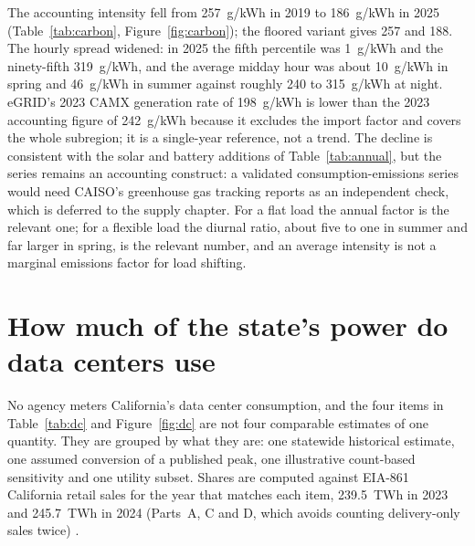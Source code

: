 \begin{table}[H]
\centering\footnotesize
\caption{CAISO battery fleet energy and peak power from the five-minute fuel mix.}
\label{tab:battery}

\end{table}

The accounting intensity fell from 257~g/kWh in 2019 to 186~g/kWh in 2025 (Table~\ref{tab:carbon}, Figure~\ref{fig:carbon}); the floored variant gives 257 and 188. The hourly spread widened: in 2025 the fifth percentile was 1~g/kWh and the ninety-fifth 319~g/kWh, and the average midday hour was about 10~g/kWh in spring and 46~g/kWh in summer against roughly 240 to 315~g/kWh at night. eGRID's 2023 CAMX generation rate of 198~g/kWh is lower than the 2023 accounting figure of 242~g/kWh because it excludes the import factor and covers the whole subregion; it is a single-year reference, not a trend. The decline is consistent with the solar and battery additions of Table~\ref{tab:annual}, but the series remains an accounting construct: a validated consumption-emissions series would need CAISO's greenhouse gas tracking reports as an independent check, which is deferred to the supply chapter. For a flat load the annual factor is the relevant one; for a flexible load the diurnal ratio, about five to one in summer and far larger in spring, is the relevant number, and an average intensity is not a marginal emissions factor for load shifting.

\section{How much of the state's power do data centers use}
\label{sec:dcload}

No agency meters California's data center consumption, and the four items in Table~\ref{tab:dc} and Figure~\ref{fig:dc} are not four comparable estimates of one quantity. They are grouped by what they are: one statewide historical estimate, one assumed conversion of a published peak, one illustrative count-based sensitivity and one utility subset. Shares are computed against EIA-861 California retail sales for the year that matches each item, 239.5~TWh in 2023 and 245.7~TWh in 2024 (Parts~A, C and D, which avoids counting delivery-only sales twice) \citep{eia861}.

\begin{table}[H]
\centering\footnotesize
\caption{Silicon Valley Power fact-sheet series used for the utility-subset estimate.}
\label{tab:svp}
\resizebox{\textwidth}{!}{}\\[2pt] 
\end{table}

